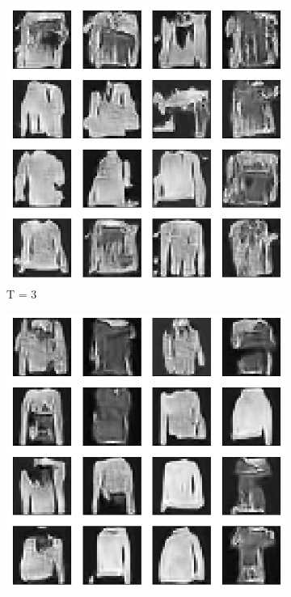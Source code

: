 \documentclass{article}
\begin{document}
\begin{figure}[H]
	\begin{subfigure}[h]{0.3\linewidth}
		\centering
		\includegraphics[scale=0.3]{../code/generated_DDGAN_3.png}
		\caption{T = 3}
	\end{subfigure}
	\hfill
	\begin{subfigure}[h]{0.3\linewidth}
		\centering
		\includegraphics[scale=0.3]{../code/generated_DDGAN_5.png}

\end{subfigure}
\end{figure}
\end{document}
